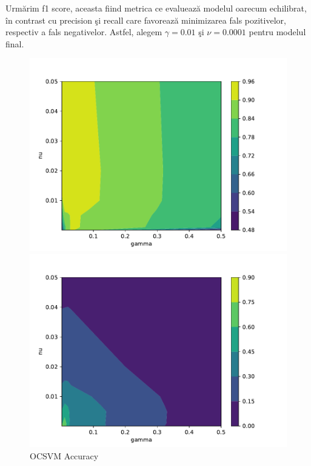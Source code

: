 Urmărim f1 score, aceasta fiind metrica ce evaluează modelul oarecum 
echilibrat, în contrast cu precision şi recall care favorează minimizarea fals pozitivelor, 
respectiv a fals negativelor. Astfel, alegem $\gamma=0.01$ şi $\nu=0.0001$ pentru modelul final.

\begin{figure}[p] %
    \begin{minipage}[t]{0.5\textwidth}
        \vspace{0pt}
        \includegraphics[width=\textwidth]{images/ocsvm-accuracy.pdf}
        \caption{OCSVM Accuracy}
    \end{minipage}
    \hfill
    \begin{minipage}[t]{0.5\textwidth}
        \vspace{0pt}
        \includegraphics[width=\textwidth]{images/ocsvm-precision.pdf}

\end{minipage}
\end{figure}
